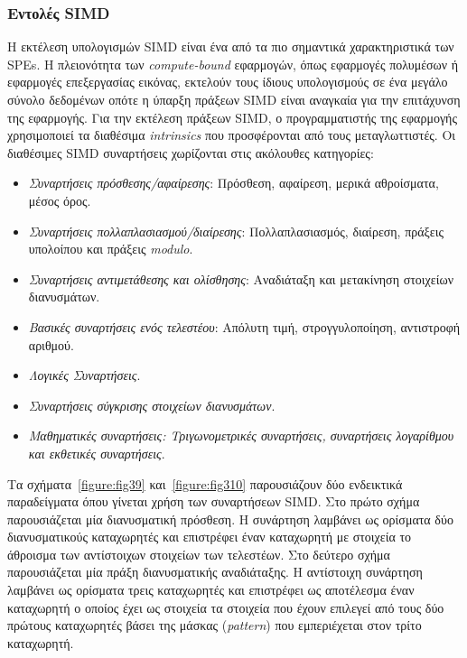 \subsubsection{Εντολές SIMD}
\label{subsubsection:subsub3321}
\indent
Η εκτέλεση υπολογισμών \acf{SIMD} είναι ένα από τα πιο σημαντικά χαρακτηριστικά των \acp{SPE}. Η πλειονότητα των \textsl{compute-bound} εφαρμογών, όπως εφαρμογές πολυμέσων ή εφαρμογές επεξεργασίας εικόνας, εκτελούν τους ίδιους υπολογισμούς σε ένα μεγάλο σύνολο δεδομένων οπότε η ύπαρξη πράξεων \ac{SIMD} είναι αναγκαία για την επιτάχυνση της εφαρμογής.\newline \indent
Για την εκτέλεση πράξεων \ac{SIMD}, ο προγραμματιστής της εφαρμογής χρησιμοποιεί τα διαθέσιμα \textsl{intrinsics} που προσφέρονται από τους μεταγλωττιστές. Οι διαθέσιμες \ac{SIMD} συναρτήσεις χωρίζονται στις ακόλουθες κατηγορίες:
\begin{itemize}

\item{\textsl{Συναρτήσεις πρόσθεσης/αφαίρεσης}: Πρόσθεση, αφαίρεση, μερικά αθροίσματα, μέσος όρος.}

\item{\textsl{Συναρτήσεις πολλαπλασιασμού/διαίρεσης}: Πολλαπλασιασμός, διαίρεση, πράξεις υπολοίπου και πράξεις \textsl{modulo}.}

\item{\textsl{Συναρτήσεις αντιμετάθεσης και ολίσθησης}: Αναδιάταξη και μετακίνηση στοιχείων διανυσμάτων.}

\item{\textsl{Βασικές συναρτήσεις ενός τελεστέου}: Απόλυτη τιμή, στρογγυλοποίηση, αντιστροφή αριθμού.}

\item{\textsl{Λογικές Συναρτήσεις}.}

\item{\textsl{Συναρτήσεις σύγκρισης στοιχείων διανυσμάτων}.}

\item{\textsl{Μαθηματικές συναρτήσεις: Τριγωνομετρικές συναρτήσεις, συναρτήσεις λογαρίθμου και εκθετικές συναρτήσεις}.}

\end{itemize}
\indent
Τα σχήματα~\ref{figure:fig39} και~\ref{figure:fig310} παρουσιάζουν δύο ενδεικτικά παραδείγματα όπου γίνεται χρήση των συναρτήσεων \ac{SIMD}. Στο πρώτο σχήμα παρουσιάζεται μία διανυσματική πρόσθεση. Η συνάρτηση λαμβάνει ως ορίσματα δύο διανυσματικούς καταχωρητές και επιστρέφει έναν καταχωρητή με στοιχεία το άθροισμα των αντίστοιχων στοιχείων των τελεστέων. Στο δεύτερο σχήμα παρουσιάζεται μία πράξη διανυσματικής αναδιάταξης. Η αντίστοιχη συνάρτηση λαμβάνει ως ορίσματα τρεις καταχωρητές και επιστρέφει ως αποτέλεσμα έναν καταχωρητή ο οποίος έχει ως στοιχεία τα στοιχεία που έχουν επιλεγεί από τους δύο πρώτους καταχωρητές βάσει της μάσκας (\textsl{pattern}) που εμπεριέχεται στον τρίτο καταχωρητή.

